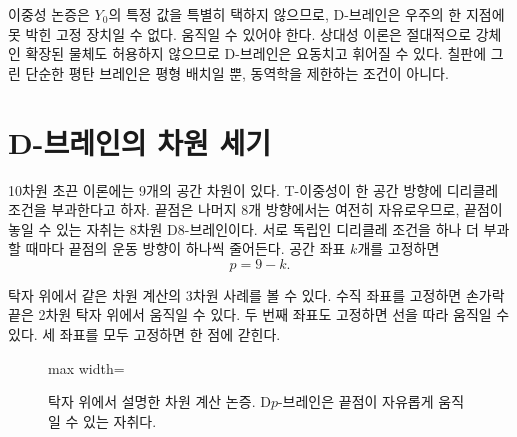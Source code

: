 이중성 논증은 \(Y_0\)의 특정 값을 특별히 택하지 않으므로, D-브레인은 우주의 한 지점에 못 박힌 고정 장치일 수 없다. 움직일 수 있어야 한다. 상대성 이론은 절대적으로 강체인 확장된 물체도 허용하지 않으므로 D-브레인은 요동치고 휘어질 수 있다. 칠판에 그린 단순한 평탄 브레인은 평형 배치일 뿐, 동역학을 제한하는 조건이 아니다.

\begin{classroomqa}
\end{classroomqa}

\section{D-브레인의 차원 세기}

10차원 초끈 이론에는 9개의 공간 차원이 있다. T-이중성이 한 공간 방향에 디리클레 조건을 부과한다고 하자. 끝점은 나머지 8개 방향에서는 여전히 자유로우므로, 끝점이 놓일 수 있는 자취는 8차원 D8-브레인이다. 서로 독립인 디리클레 조건을 하나 더 부과할 때마다 끝점의 운동 방향이 하나씩 줄어든다. 공간 좌표 \(k\)개를 고정하면
\begin{equation}
  p=9-k.
  \label{eq:l10-dp-counting}
\end{equation}

탁자 위에서 같은 차원 계산의 3차원 사례를 볼 수 있다. 수직 좌표를 고정하면 손가락 끝은 2차원 탁자 위에서 움직일 수 있다. 두 번째 좌표도 고정하면 선을 따라 움직일 수 있다. 세 좌표를 모두 고정하면 한 점에 갇힌다.

\begin{figure}[H]
  \centering
  \begin{adjustbox}{max width=\linewidth}
  \end{adjustbox}
  \caption{탁자 위에서 설명한 차원 계산 논증. D\(p\)-브레인은 끝점이 자유롭게 움직일 수 있는 자취다.}
  \label{fig:l10-dp-counting-redraw}
\end{figure}

